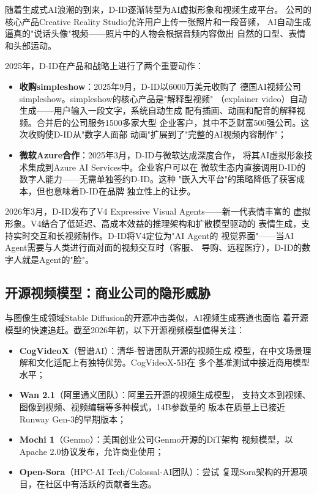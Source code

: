 随着生成式AI浪潮的到来，D-ID逐渐转型为AI虚拟形象和视频生成平台。
公司的核心产品Creative Reality Studio允许用户上传一张照片和一段音频，
AI自动生成逼真的"说话头像"视频——照片中的人物会根据音频内容做出
自然的口型、表情和头部运动。

2025年，D-ID在产品和战略上进行了两个重要动作：

\begin{itemize}
  \item \textbf{收购simpleshow}：2025年9月，D-ID以6000万美元收购了
    德国AI视频公司simpleshow。simpleshow的核心产品是"解释型视频"
    （explainer video）自动生成——用户输入一段文字，系统自动生成
    配有插画、动画和配音的解释视频。合并后的公司服务1500多家大型
    企业客户，其中不乏财富500强公司。这次收购使D-ID从"数字人面部
    动画"扩展到了"完整的AI视频内容制作"；
  \item \textbf{微软Azure合作}：2025年3月，D-ID与微软达成深度合作，
    将其AI虚拟形象技术集成到Azure AI Services中。企业客户可以在
    微软生态内直接调用D-ID的数字人能力——无需单独签约D-ID。这种
    "嵌入大平台"的策略降低了获客成本，但也意味着D-ID在品牌
    独立性上的让步。
\end{itemize}

2026年3月，D-ID发布了V4 Expressive Visual Agents——新一代表情丰富的
虚拟形象。V4结合了低延迟、高成本效益的推理架构和扩散模型驱动的
表情生成，支持实时交互和长视频制作。D-ID将V4定位为"AI Agent的
视觉界面"——当AI Agent需要与人类进行面对面的视频交互时（客服、
导购、远程医疗），D-ID的数字人就是Agent的"脸"。

\subsection{开源视频模型：商业公司的隐形威胁}
\label{subsec:opensource-video}

与图像生成领域Stable Diffusion的开源冲击类似，AI视频生成赛道也面临
着开源模型的快速追赶。截至2026年初，以下开源视频模型值得关注：

\begin{itemize}
  \item \textbf{CogVideoX}（智谱AI）：清华-智谱团队开源的视频生成
    模型，在中文场景理解和文化适配上有独特优势。CogVideoX-5B在
    多个基准测试中接近商用模型水平；
  \item \textbf{Wan 2.1}（阿里通义团队）：阿里云开源的视频生成模型，
    支持文本到视频、图像到视频、视频编辑等多种模式，14B参数量的
    版本在质量上已接近Runway Gen-3的早期版本；
  \item \textbf{Mochi 1}（Genmo）：美国创业公司Genmo开源的DiT架构
    视频模型，以Apache 2.0协议发布，允许商业使用；
  \item \textbf{Open-Sora}（HPC-AI Tech/Colossal-AI团队）：尝试
    复现Sora架构的开源项目，在社区中有活跃的贡献者生态。
\end{itemize}

